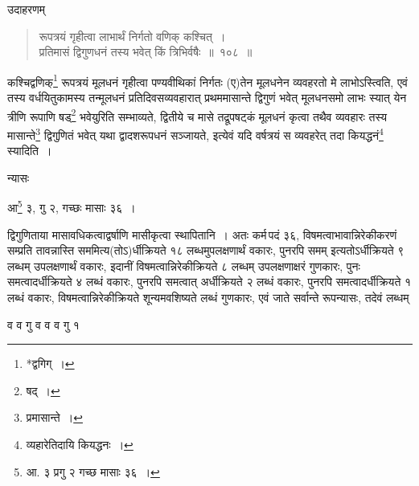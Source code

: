 \documentclass[10pt, openany]{book}
\begin{document}
{{{{{{{{{{{{उदाहरणम्\textendash}

\begin{quote}
    
{\eg रूपत्रयं गृहीत्वा लाभार्थं निर्गतो वणिक् कश्चित्~।\\
 प्रतिमासं द्विगुणधनं तस्य भवेत् किं त्रिभिर्वषैः~॥~१०८~॥}\end{quote}

{कश्चिद्वणिक्\renewcommand{\thefootnote}{१३}\footnote{*द्वगिग्~।} रूपत्रयं मूलधनं गृहीत्वा पण्यवीथिकां निर्गतः (ए)तेन
मूलधनेन व्यवहरतो मे लाभोऽस्त्विति, एवं तस्य वर्धयितुकामस्य तन्मूलधनं
प्रतिदिवसव्यवहारात्}
{प्रथममासान्ते द्विगुणं भवेत् मूलधनसमो लाभः स्यात् येन त्रीणि रूपाणि
षड्\renewcommand{\thefootnote}{१४}\footnote{षद्~।} भवेयुरिति}
{सम्भाव्यते, द्वितीये च मासे तद्रूपषट्कं मूलधनं कृत्वा तथैव व्यवहारः तस्य
मासान्ते\renewcommand{\thefootnote}{१५}\footnote{प्रमासान्ते~।} द्विगुणितं}
{भवेत् यथा द्वादशरूपधनं सञ्जायते, इत्येवं यदि वर्षत्रयं स व्यवहरेत् तदा
कियद्धनं\renewcommand{\thefootnote}{१६}\footnote{व्यहारेतिदायि
कियद्धनः~।} स्यादिति~।}

\newpage

{न्यासः\textendash}
\vspace{1mm}

\hspace{15mm} {आ\renewcommand{\thefootnote}{१}\footnote{आ. ३ प्रगु २ गच्छ मासाः ३६~।} ३, गु २, गच्छः मासाः ३६~।}
\vspace{3mm}

{द्विगुणिताया मासावधिकत्वाद्वर्षाणि मासीकृत्वा स्थापितानि~। अतः कर्म\textendash \,पदं ३६,}
{विषमत्वाभावान्निरेकीकरणं सम्प्रति तावन्नास्ति सममित्य(तोऽ)र्धीक्रियते
१८ लब्धमुपलक्षणार्थं}
{वकारः, पुनरपि समम् इत्यतोऽर्धीक्रियते ९ लब्धम् उपलक्षणार्थं वकारः, इदानीं
विषमत्वान्निरेकीक्रियते ८ लब्धम् उपलक्षणाक्षरं गुणकारः, पुनः समत्वादर्धीक्रियते ४ लब्धं
वकारः, पुनरपि}
{समत्वात् अर्धीक्रियते २ लब्धं वकारः, पुनरपि समत्वादर्धीक्रियते १ लब्धं
वकारः, विषमत्वान्निरेकीक्रियते शून्यमवशिष्यते लब्धं गुणकारः, एवं जाते सर्वान्ते रूपन्यासः,
तदेवं लब्धम्}

\begin{center}
    
{व व गु व व व गु १}\end{center}

}}}}}}}}}}}
\end{document}
